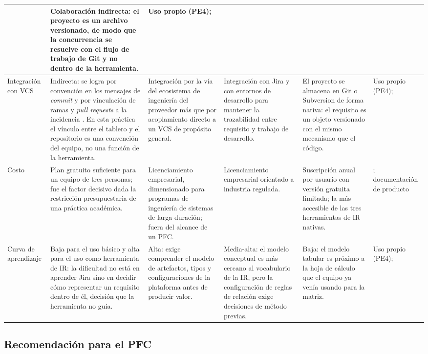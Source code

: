 \documentclass[11pt,letterpaper]{article}
\begin{document}
{\begin{longtable}{L{1.9cm} L{2.5cm} L{2.5cm} L{2.5cm} L{2.5cm} L{1.5cm}}
& Colaboración indirecta: el proyecto es un archivo versionado, de modo que la concurrencia se resuelve con el flujo de trabajo de Git y no dentro de la herramienta.
& Uso propio (PE4); \cite{ibmdoorsnext,jamatrace,reqview}\\
\midrule
Integración con VCS
& Indirecta: se logra por convención en los mensajes de \emph{commit} y por vinculación de ramas y \emph{pull requests} a la incidencia \cite{clelandhuang2012}. En esta práctica el vínculo entre el tablero y el repositorio es una convención del equipo, no una función de la herramienta.
& Integración por la vía del ecosistema de ingeniería del proveedor más que por acoplamiento directo a un VCS de propósito general.
& Integración con Jira y con entornos de desarrollo para mantener la trazabilidad entre requisito y trabajo de desarrollo.
& El proyecto se almacena en Git o Subversion de forma nativa: el requisito es un objeto versionado con el mismo mecanismo que el código.
& Uso propio (PE4); \cite{clelandhuang2012,ibmdoorsnext,jamatrace,reqview}\\
\midrule
Costo
& Plan gratuito suficiente para un equipo de tres personas; fue el factor decisivo dada la restricción presupuestaria de una práctica académica.
& Licenciamiento empresarial, dimensionado para programas de ingeniería de sistemas de larga duración; fuera del alcance de un PFC.
& Licenciamiento empresarial orientado a industria regulada.
& Suscripción anual por usuario con versión gratuita limitada; la más accesible de las tres herramientas de IR nativas.
& \cite{reqview}; documentación de producto\\
\midrule
Curva de aprendizaje
& Baja para el uso básico y alta para el uso como herramienta de IR: la dificultad no está en aprender Jira sino en decidir cómo representar un requisito dentro de él, decisión que la herramienta no guía.
& Alta: exige comprender el modelo de artefactos, tipos y configuraciones de la plataforma antes de producir valor.
& Media-alta: el modelo conceptual es más cercano al vocabulario de la IR, pero la configuración de reglas de relación exige decisiones de método previas.
& Baja: el modelo tabular es próximo a la hoja de cálculo que el equipo ya venía usando para la matriz.
& Uso propio (PE4); \cite{ibmdoorsnext,jamatrace,reqview}\\
\end{longtable}}

\subsection*{Recomendación para el PFC}
\end{document}
